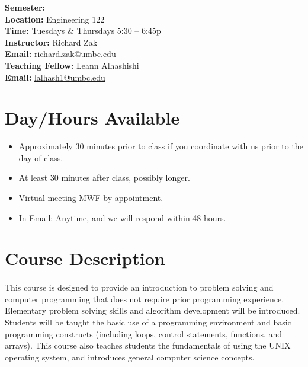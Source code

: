 \documentclass[letter,11pt]{article}
\begin{document}
\textbf{Semester:} \\
\textbf{Location:} Engineering 122 \\
\textbf{Time:} Tuesdays \& Thursdays 5:30 -- 6:45p \\
\textbf{Instructor:} Richard Zak \\
\textbf{Email:} \href{mailto:richard.zak@umbc.edu?Subject=CMSC104}{richard.zak@umbc.edu} \\
\textbf{Teaching Fellow:} Leann Alhashishi \\
\textbf{Email:} \href{mailto:lalhash1@umbc.edu?Subject=CMSC104}{lalhash1@umbc.edu}

\section*{Day/Hours Available}
\begin{itemize}
\item Approximately 30 minutes prior to class if you coordinate with us prior to the day of class.
\item At least 30 minutes after class, possibly longer.
\item Virtual meeting MWF by appointment.
\item In Email: Anytime, and we will respond within 48 hours.
\end{itemize}


\section*{Course Description}
\paragraph{}This course is designed to provide an introduction to problem solving and computer programming that does not require prior programming experience. Elementary problem solving skills and algorithm development will be introduced. Students will be taught the basic use of a programming environment and basic programming constructs (including loops, control statements, functions, and arrays). This course also teaches students the fundamentals of using the UNIX operating system, and introduces general computer science concepts.
\end{document}
